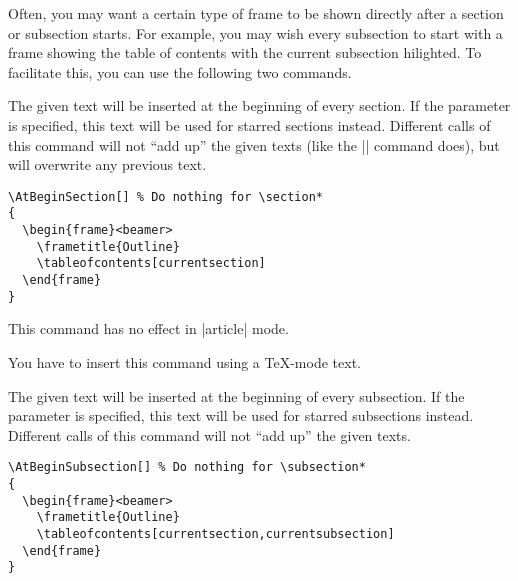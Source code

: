 Often, you may want a certain type of frame to be shown directly after
a section or subsection starts. For example, you may wish every
subsection to start with a frame showing the table of contents with
the current subsection hilighted. To facilitate this, you can use the
following two commands.


\begin{command}{\AtBeginSection{}}
  The given text will be inserted at the beginning of every
  section. If the  parameter is specified,
  this text will be used for starred sections instead. Different calls
  of this command will not ``add up'' the given texts (like the
  |\AtBeginDocument| command does), but will  overwrite any previous
  text. 
  
  \example
\begin{verbatim}
\AtBeginSection[] % Do nothing for \section*
{
  \begin{frame}<beamer>
    \frametitle{Outline}
    \tableofcontents[currentsection]
  \end{frame}
}
\end{verbatim}

  \articlenote
  This command has no effect in |article| mode.

  \lyxnote
  You have to insert this command using a \TeX-mode text.
\end{command}


\begin{command}{\AtBeginSubsection{}}
  The given text will be inserted at the beginning of every
  subsection. If the  parameter is specified,
  this text will be used for starred subsections instead. Different calls
  of this command will not ``add up'' the given texts.
  
  \example
\begin{verbatim}
\AtBeginSubsection[] % Do nothing for \subsection*
{
  \begin{frame}<beamer>
    \frametitle{Outline}
    \tableofcontents[currentsection,currentsubsection]
  \end{frame}
}
\end{verbatim}
\end{command}





